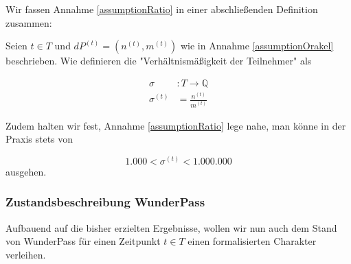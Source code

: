 \vspace{0.3cm}

Wir fassen Annahme \ref{assumptionRatio} in einer abschließenden Definition zusammen:

\vspace{0.3cm}

\begin{Def}\label{defZiel}

Seien $t \in T$ und $dP^{(t)} = \left(n^{(t)}, m^{(t)}\right)$ wie in Annahme \ref{assumptionOrakel} beschrieben. Wie definieren die "Verhältnismäßigkeit der Teilnehmer" als

\begin{align*}
\sigma &: T \rightarrow \mathbb{Q} \\
\sigma^{(t)} &= \frac{n^{(t)}}{m^{(t)}}
\end{align*}

\vspace{0.3cm}

Zudem halten wir fest, Annahme \ref{assumptionRatio} lege nahe, man könne in der Praxis stets von

\begin{equation*}
1.000 < \sigma^{(t)} < 1.000.000
\end{equation*}
ausgehen.

\end{Def}














\vspace{1cm}

\subsubsection{Zustandsbeschreibung WunderPass}
\label{sec:eco_zahlen_zustand_wp}

Aufbauend auf die bisher erzielten Ergebnisse, wollen wir nun auch dem Stand von WunderPass für einen Zeitpunkt $t \in T$ einen formalisierten Charakter verleihen.

\vspace{0.3cm}

